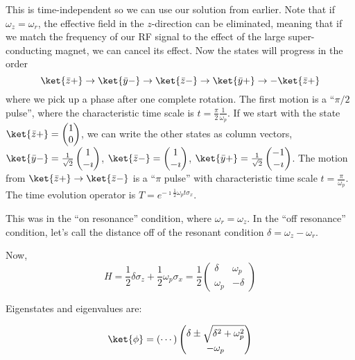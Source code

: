 \documentclass[a4paper,twoside,master.tex]{subfiles}
\begin{document}
This is time-independent so we can use our solution from earlier. Note
that if $\omega_z = \omega_r$, the effective field in the
$z$-direction can be eliminated, meaning that if we match the
frequency of our RF signal to the effect of the large super-conducting
magnet, we can cancel its effect. Now the states will progress in the
order
\begin{equation}
\ket{\bar{z}+}\to\ket{\bar{y}-}\to\ket{\bar{z}-}\to\ket{\bar{y}+}\to-\ket{\bar{z}+}
\end{equation}
where we pick up a phase after one complete rotation. The first motion
is a ``$\pi/2$ pulse'', where the characteristic time scale is
$t=\frac{\pi}{2}\frac{1}{\omega_p}$. If we start with the state
$\ket{\bar{z}+} = \begin{pmatrix}1\\0\end{pmatrix}$, we can write
the other states as column vectors,
$\ket{\bar{y}-} = \frac{1}{\sqrt{2}}\begin{pmatrix}1\\-\imath\end{pmatrix}$,
$\ket{\bar{z}-} = \begin{pmatrix}1\\-\imath\end{pmatrix}$,
$\ket{\bar{y}+} = \frac{1}{\sqrt{2}}\begin{pmatrix}-1\\-\imath\end{pmatrix}$.
The motion from $\ket{\bar{z}+}\to\ket{\bar{z}-}$ is a ``$\pi$
pulse'' with characteristic time scale $t=\frac{\pi}{\omega_p}$. The
time evolution operator is
$T=e^{-\imath\frac{1}{2}\omega_p t\sigma_x}$.

This was in the ``on resonance'' condition, where $\omega_r = \omega_z$.
In the ``off resonance'' condition, let's call the distance off of the
resonant condition $\delta = \omega_z - \omega_r$.

Now,
\begin{equation}
H=\frac{1}{2}\delta\sigma_z + \frac{1}{2}\omega_p\sigma_x = \frac{1}{2}\begin{pmatrix}\delta&\omega_p\\\omega_p&-\delta\end{pmatrix}
\end{equation}

Eigenstates and eigenvalues are:

\begin{equation}
\ket{\phi} = (\cdots)\begin{pmatrix}\delta\pm\sqrt{\delta^2+\omega_p^2}\\-\omega_p\end{pmatrix}
\end{equation}
\end{document}
